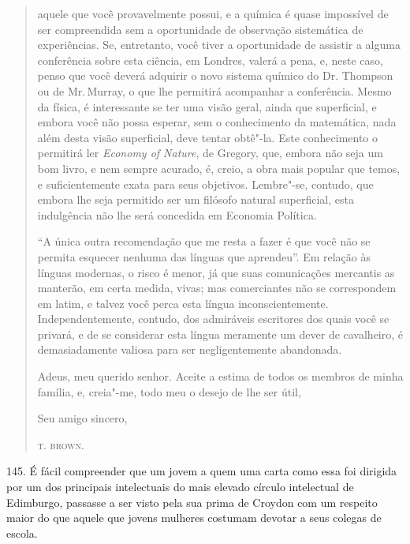 \begin{quote}
aquele que você provavelmente possui, e a química é quase impossível de
ser compreendida sem a oportunidade de observação sistemática de
experiências. Se, entretanto, você tiver a oportunidade de assistir a
alguma conferência sobre esta ciência, em Londres, valerá a pena, e,
neste caso, penso que você deverá adquirir o novo sistema químico do Dr.
Thompson ou de Mr.\,Murray, o que lhe permitirá acompanhar a conferência.
Mesmo da física, é interessante se ter uma visão geral, ainda que
superficial, e embora você não possa esperar, sem o conhecimento da
matemática, nada além desta visão superficial, deve tentar obtê"-la. Este
conhecimento o permitirá ler \emph{Economy of Nature}, de Gregory, que,
embora não seja um bom livro, e nem sempre acurado, é, creio, a obra
mais popular que temos, e suficientemente exata para seus objetivos.
Lembre"-se, contudo, que embora lhe seja permitido ser um filósofo
natural superficial, esta indulgência não lhe será concedida em Economia
Política.

``A única outra recomendação que me resta a fazer é que você não se
permita esquecer nenhuma das línguas que aprendeu''. Em relação às
línguas modernas, o risco é menor, já que suas comunicações mercantis as
manterão, em certa medida, vivas; mas comerciantes não se correspondem
em latim, e talvez você perca esta língua inconscientemente.
Independentemente, contudo, dos admiráveis escritores dos quais você se
privará, e de se considerar esta língua meramente um dever de
cavalheiro, é demasiadamente valiosa para ser negligentemente
abandonada.

Adeus, meu querido senhor. Aceite a estima de todos os membros de minha
família, e, creia"-me, todo meu o desejo de lhe ser útil,

\bigskip

\hfill{}Seu amigo sincero,

\hfill{}\textsc{t. brown.}
\end{quote}

145. É fácil compreender que um jovem a quem uma carta como essa foi
dirigida por um dos principais intelectuais do mais elevado círculo
intelectual de Edimburgo, passasse a ser visto pela sua prima de Croydon
com um respeito maior do que aquele que jovens mulheres costumam devotar
a seus colegas de escola.

